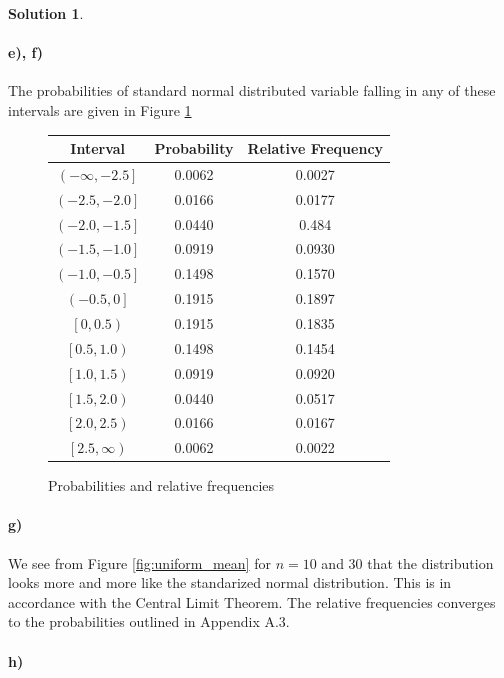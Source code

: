 \documentclass[a4paper, fleqn]{amsart}
\theoremstyle{definition}
\newtheorem{sltn}{Solution}
\begin{document}
\begin{sltn}
\paragraph{e), f)}

The probabilities of standard normal distributed variable falling in 
any of these intervals are given in Figure \ref{fig:relative_frequencies}
\begin{figure}[p]
  \centering
  \label{fig:relative_frequencies}
  \begin{tabular}{c|c|c}
  Interval & Probability & Relative Frequency \\
  \hline
  $\left( -\infty, -2.5 \right]$ & 0.0062 & 0.0027\\
  $\left( -2.5, -2.0 \right]$ & 0.0166 & 0.0177\\
  $\left( -2.0, -1.5 \right]$ & 0.0440 & 0.484\\
  $\left( -1.5, -1.0 \right]$ & 0.0919 & 0.0930\\
  $\left( -1.0, -0.5 \right]$ & 0.1498 & 0.1570\\
  $\left( -0.5, 0 \right]$ & 0.1915 & 0.1897\\
  $\left[ 0, 0.5 \right)$ & 0.1915 & 0.1835\\
  $\left[ 0.5, 1.0 \right)$ & 0.1498 &0.1454\\
  $\left[ 1.0, 1.5 \right)$ & 0.0919 & 0.0920\\
  $\left[ 1.5, 2.0 \right)$ & 0.0440 & 0.0517\\
  $\left[ 2.0, 2.5 \right)$ & 0.0166 &0.0167\\
  $\left[ 2.5, \infty \right)$ & 0.0062 & 0.0022\\
\end{tabular}
\caption{Probabilities and relative frequencies}
\end{figure}
\paragraph{g)}
We see from Figure \ref{fig:uniform_mean} for $n = 10$ and $30$ that the
distribution looks more and more like the standarized normal distribution. This
is in accordance with the Central Limit Theorem. The relative frequencies
converges to the probabilities outlined in Appendix A.3.

\paragraph{h)}


\end{sltn}
\end{document}
